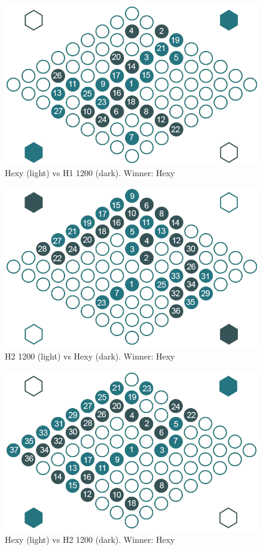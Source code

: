 \begin{figure}[ht]
	\centering
	\includegraphics[width=.75\textwidth]{graphics/games/hexy-h1-1200.png}
	\caption{Hexy (light) vs H1 1200 (dark). Winner: Hexy}
	\label{fig-hexy-h1-1200}
\end{figure}
\vspace{1cm}

\begin{figure}[ht]
	\centering
	\includegraphics[width=.75\textwidth]{graphics/games/h2-1200-hexy.png}
	\caption{H2 1200 (light) vs Hexy (dark). Winner: Hexy}
	\label{fig-h2-1200-hexy}
\end{figure}
\vspace{1cm}

\begin{figure}[ht]
	\centering
	\includegraphics[width=.75\textwidth]{graphics/games/hexy-h2-1200.png}
	\caption{Hexy (light) vs H2 1200 (dark). Winner: Hexy}
	\label{fig-hexy-h2-1200}
\end{figure}
\vspace{1cm}

